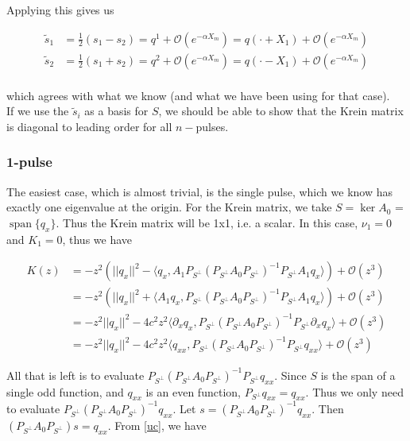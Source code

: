 \documentclass[12pt]{article}
\DeclareMathOperator{\spn}{span}
\begin{document}
Applying this gives us

\begin{align*}
\tilde{s}_1 &= \frac{1}{2}(s_1 - s_2) = q^1 + \mathcal{O}(e^{-\alpha X_m})
 = q(\cdot + X_1) + \mathcal{O}(e^{-\alpha X_m})\\
\tilde{s}_2 &= \frac{1}{2}(s_1 + s_2) = q^2 + \mathcal{O}(e^{-\alpha X_m})
 = q(\cdot - X_1) + \mathcal{O}(e^{-\alpha X_m}) \\
\end{align*}

which agrees with what we know (and what we have been using for that case).\\

If we use the $\tilde{s}_i$ as a basis for $S$, we should be able to show that the Krein matrix is diagonal to leading order for all $n-$pulses.

\subsubsection{1-pulse}

The easiest case, which is almost trivial, is the single pulse, which we know has exactly one eigenvalue at the origin. For the Krein matrix, we take $S = \ker A_0$ = $\spn \{q_x\}$. Thus the Krein matrix will be 1x1, i.e. a scalar. In this case, $\nu_1 = 0$ and $K_1 = 0$, thus we have

\begin{align*}
K(z) &= -z^2\left( ||q_x||^2 - \langle q_x, A_1 P_{S^\perp} (P_{S^\perp} A_0 P_{S^\perp})^{-1} P_{S^\perp} A_1 q_x \rangle \right) + \mathcal{O}(z^3) \\
&= -z^2\left( ||q_x||^2 + \langle A_1 q_x, P_{S^\perp} (P_{S^\perp} A_0 P_{S^\perp})^{-1} P_{S^\perp} A_1 q_x \rangle \right) + \mathcal{O}(z^3) \\
&= - z^2 ||q_x||^2 - 4 c^2 z^2 \langle \partial_x q_x, P_{S^\perp} (P_{S^\perp} A_0 P_{S^\perp})^{-1} P_{S^\perp} \partial_x q_x \rangle + \mathcal{O}(z^3) \\
&= - z^2 ||q_x||^2 - 4 c^2 z^2 \langle q_{xx}, P_{S^\perp} (P_{S^\perp} A_0 P_{S^\perp})^{-1} P_{S^\perp} q_{xx} \rangle + \mathcal{O}(z^3)
\end{align*}

All that is left is to evaluate $P_{S^\perp} (P_{S^\perp} A_0 P_{S^\perp})^{-1} P_{S^\perp} q_{xx}$. Since $S$ is the span of a single odd function, and $q_{xx}$ is an even function, $P_{S^\perp} q_{xx} = q_{xx}$. Thus we only need to evaluate $P_{S^\perp} (P_{S^\perp} A_0 P_{S^\perp})^{-1} q_{xx}$. Let $s = (P_{S^\perp} A_0 P_{S^\perp})^{-1} q_{xx}$. Then $(P_{S^\perp} A_0 P_{S^\perp}) s = q_{xx}$. From \eqref{uc}, we have
\end{document}
